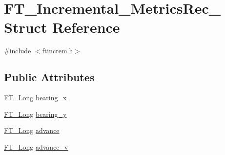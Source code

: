 \hypertarget{struct_f_t___incremental___metrics_rec__}{\section{F\-T\-\_\-\-Incremental\-\_\-\-Metrics\-Rec\-\_\- Struct Reference}
\label{struct_f_t___incremental___metrics_rec__}
}


{\ttfamily \#include $<$ftincrem.\-h$>$}

\subsection*{Public Attributes}
\begin{DoxyCompactItemize}
\item 
\hyperlink{fttypes_8h_a7fa72a1f0e79fb1860c5965789024d6f}{F\-T\-\_\-\-Long} \hyperlink{struct_f_t___incremental___metrics_rec___af065d998d0a0f2a57513125038d802a6}{bearing\-\_\-x}
\item 
\hyperlink{fttypes_8h_a7fa72a1f0e79fb1860c5965789024d6f}{F\-T\-\_\-\-Long} \hyperlink{struct_f_t___incremental___metrics_rec___af1443aa7c1ca54d3c2a29f1cf6d7848b}{bearing\-\_\-y}
\item 
\hyperlink{fttypes_8h_a7fa72a1f0e79fb1860c5965789024d6f}{F\-T\-\_\-\-Long} \hyperlink{struct_f_t___incremental___metrics_rec___a996c99aa0e6b36c2c7776fc1a2b6b614}{advance}
\item 
\hyperlink{fttypes_8h_a7fa72a1f0e79fb1860c5965789024d6f}{F\-T\-\_\-\-Long} \hyperlink{struct_f_t___incremental___metrics_rec___a0ee280662a03ea935dbfe377e56f4d6d}{advance\-\_\-v}
\end{DoxyCompactItemize}


